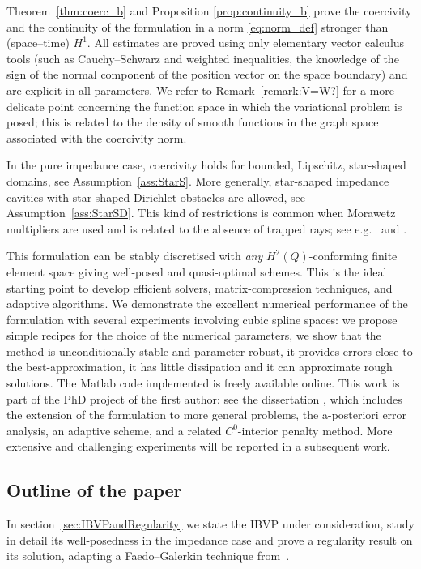 \documentclass[a4paper]{article}
\theoremstyle{plain}
\theoremstyle{definition}
\begin{document}
Theorem~\ref{thm:coerc_b} and Proposition \ref{prop:continuity_b} prove the coercivity and the continuity of the formulation in a norm \eqref{eq:norm_def} stronger than (space--time) $H^1$.
All estimates are proved using only elementary vector calculus tools (such as Cauchy--Schwarz and weighted inequalities, the knowledge of the sign of the normal component of the position vector on the space boundary) and are explicit in all parameters.
We refer to Remark~\ref{remark:V=W?} for a more delicate point concerning the function space in which the variational problem is posed; this is related to the density of smooth functions in the graph space associated with the coercivity norm.

In the pure impedance case, coercivity holds for bounded, Lipschitz, star-shaped domains, see Assumption~\ref{ass:StarS}.
More generally, star-shaped impedance cavities with star-shaped Dirichlet obstacles are allowed, see Assumption~\ref{ass:StarSD}.
This kind of restrictions is common when Morawetz multipliers are used and is related to the absence of trapped rays; see e.g.~\cite[sect.~6]{Moiola2014} and \cite{morawetz1961decay}.

This formulation can be stably discretised with \emph{any} $H^2(Q)$-conforming finite element space giving well-posed and quasi-optimal schemes.
This is the ideal starting point to develop efficient solvers, matrix-compression techniques, and adaptive algorithms.
We demonstrate the excellent numerical performance of the formulation with several experiments involving cubic spline spaces: we propose simple recipes for the choice of the numerical parameters, we show that the method is unconditionally stable and parameter-robust, it provides errors close to the best-approximation, it has little dissipation and it can approximate rough solutions.
The Matlab code implemented is freely available online.
This work is part of the PhD project of the first author: see the dissertation \cite{Bignardi2025},
which includes the extension of the formulation to more general problems, the a-posteriori error analysis, an adaptive scheme, and a related $C^0$-interior penalty method.
More extensive and challenging experiments will be reported in a subsequent work.


\subsection{Outline of the paper}
In section~\ref{sec:IBVPandRegularity} we state the IBVP under consideration, study in detail its well-posedness in the impedance case and prove a regularity result on its solution, adapting a Faedo--Galerkin technique from~\cite{ladyzhenskaya-bvp}.
\end{document}

